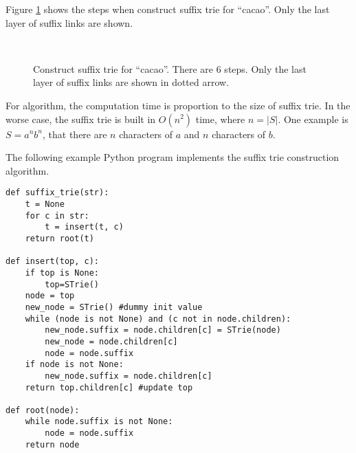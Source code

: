 \documentclass[UTF8]{article}
\begin{document}
Figure \ref{fig:cons-strie-cacao} shows the steps
when construct suffix trie for ``cacao''.
Only the last layer of suffix links are shown.

\begin{figure}[htbp]
  \centering
   \\
  \caption{Construct suffix trie for ``cacao''. There are 6 steps. Only the last layer of suffix links are shown in dotted arrow.}
  \label{fig:cons-strie-cacao}
\end{figure}

For  algorithm, the computation time
is proportion to the size of suffix trie. In the worse case, the suffix trie is
built in $O(n^2)$ time, where $n = |S|$. One example is $S=a^nb^n$, that there are $n$
characters of $a$ and $n$ characters of $b$.

The following example Python program implements the suffix trie construction algorithm.

\lstset{language=Python}
\begin{lstlisting}
def suffix_trie(str):
    t = None
    for c in str:
        t = insert(t, c)
    return root(t)

def insert(top, c):
    if top is None:
        top=STrie()
    node = top
    new_node = STrie() #dummy init value
    while (node is not None) and (c not in node.children):
        new_node.suffix = node.children[c] = STrie(node)
        new_node = node.children[c]
        node = node.suffix
    if node is not None:
        new_node.suffix = node.children[c]
    return top.children[c] #update top

def root(node):
    while node.suffix is not None:
        node = node.suffix
    return node
\end{lstlisting}
\end{document}
